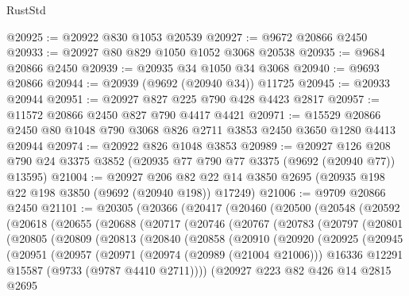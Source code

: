 \begin{lexlean}{RustStd}
\begin{coremodule}
@20925 := @20922 @830 @1053 @20539
@20927 := @9672 @20866 @2450
@20933 := @20927 @80 @829 @1050 @1052 @3068 @20538
@20935 := @9684 @20866 @2450
@20939 := @20935 @34 @1050 @34 @3068
@20940 := @9693 @20866
@20944 := @20939 (@9692 (@20940 @34)) @11725
@20945 := @20933 @20944
@20951 := @20927 @827 @225 @790 @428 @4423 @2817
@20957 := @11572 @20866 @2450 @827 @790 @4417 @4421
@20971 := @15529 @20866 @2450 @80 @1048 @790 @3068 @826 @2711 @3853 @2450 @3650 @1280 @4413 @20944
@20974 := @20922 @826 @1048 @3853
@20989 := @20927
    @126
    @208
    @790
    @24
    @3375
    @3852
    (@20935 @77 @790 @77 @3375 (@9692 (@20940 @77)) @13595)
@21004 := @20927
    @206
    @82
    @22
    @14
    @3850
    @2695
    (@20935 @198 @22 @198 @3850 (@9692 (@20940 @198)) @17249)
@21006 := @9709 @20866 @2450
@21101 := @20305
    (@20366
      (@20417
        (@20460
          (@20500
            (@20548
              (@20592
                (@20618
                  (@20655
                    (@20688
                      (@20717
                        (@20746
                          (@20767
                            (@20783
                              (@20797
                                (@20801
                                  (@20805
                                    (@20809
                                      (@20813
                                        (@20840
                                          (@20858
                                            (@20910
                                              (@20920
                                                (@20925
                                                  (@20945
                                                    (@20951
                                                      (@20957
                                                        (@20971
                                                          (@20974 (@20989 (@21004 @21006)))
                                                          @16336
                                                          @12291
                                                          @15587
                                                          (@9733 (@9787 @4410 @2711))))
                                                      (@20927
                                                        @223
                                                        @82
                                                        @426
                                                        @14
                                                        @2815
                                                        @2695

\end{coremodule}
\end{lexlean}
